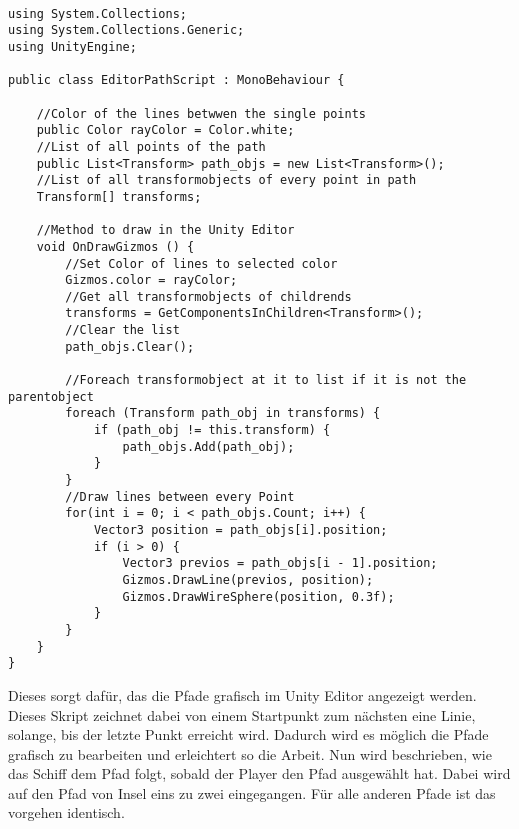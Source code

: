 \begin{scriptsize}
\lstset{
	float,
	caption=Skript EditorPathScript.cs, 
	language=[Sharp]C, 
	frame=single,  
	showstringspaces=false, 
	showspaces=false, 
	numbers=left, 
	captionpos=b, 
	belowcaptionskip=4pt,
	basicstyle=\ttfamily
} 
\newpage
\begin{lstlisting}[label=lst:c_patheditor]

using System.Collections;
using System.Collections.Generic;
using UnityEngine;

public class EditorPathScript : MonoBehaviour {

    //Color of the lines betwwen the single points
    public Color rayColor = Color.white;
    //List of all points of the path
    public List<Transform> path_objs = new List<Transform>();
    //List of all transformobjects of every point in path
    Transform[] transforms;

    //Method to draw in the Unity Editor
    void OnDrawGizmos () {
        //Set Color of lines to selected color
        Gizmos.color = rayColor;
        //Get all transformobjects of childrends
        transforms = GetComponentsInChildren<Transform>();
        //Clear the list
        path_objs.Clear();

        //Foreach transformobject at it to list if it is not the parentobject
        foreach (Transform path_obj in transforms) {
            if (path_obj != this.transform) {
                path_objs.Add(path_obj);
            }
        }
        //Draw lines between every Point
        for(int i = 0; i < path_objs.Count; i++) {
            Vector3 position = path_objs[i].position;
            if (i > 0) {
                Vector3 previos = path_objs[i - 1].position;
                Gizmos.DrawLine(previos, position);
                Gizmos.DrawWireSphere(position, 0.3f);
            }
        }
    }
}

\end{lstlisting}
\end{scriptsize}

Dieses sorgt dafür, das die Pfade grafisch im Unity Editor angezeigt werden. Dieses Skript zeichnet dabei von einem Startpunkt zum nächsten eine Linie, solange, bis der letzte Punkt erreicht wird. Dadurch wird es möglich die Pfade grafisch zu bearbeiten und erleichtert so die Arbeit. 
Nun wird beschrieben, wie das Schiff dem Pfad folgt, sobald der Player den Pfad ausgewählt hat. Dabei wird auf den Pfad von Insel eins zu zwei eingegangen. Für alle anderen Pfade ist das vorgehen identisch.

